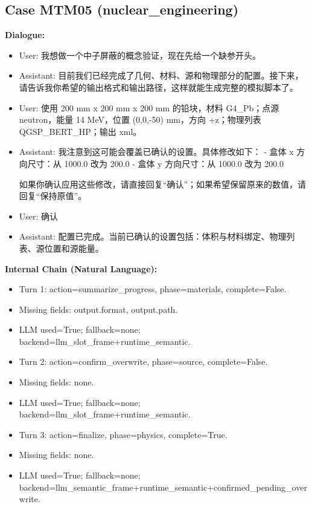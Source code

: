 \documentclass[11pt]{ctexart}
\begin{document}
\subsection{Case MTM05 (nuclear\_engineering)}
\textbf{Dialogue:}
\begin{itemize}
\item User: 我想做一个中子屏蔽的概念验证，现在先给一个缺参开头。
\item Assistant: 目前我们已经完成了几何、材料、源和物理部分的配置。接下来，请告诉我你希望的输出格式和输出路径，这样就能生成完整的模拟脚本了。
\item User: 使用 200 mm x 200 mm x 200 mm 的铅块，材料 G4\_Pb；点源 neutron，能量 14 MeV，位置 (0,0,-50) mm，方向 +z；物理列表 QGSP\_BERT\_HP；输出 xml。
\item Assistant: 我注意到这可能会覆盖已确认的设置。具体修改如下：
- 盒体 x 方向尺寸：从 1000.0 改为 200.0
- 盒体 y 方向尺寸：从 1000.0 改为 200.0

如果你确认应用这些修改，请直接回复“确认”；如果希望保留原来的数值，请回复“保持原值”。
\item User: 确认
\item Assistant: 配置已完成。当前已确认的设置包括：体积与材料绑定、物理列表、源位置和源能量。
\end{itemize}
\textbf{Internal Chain (Natural Language):}
\begin{itemize}
\item Turn 1: action=summarize\_progress, phase=materials, complete=False.
\item Missing fields: output.format, output.path.
\item LLM used=True; fallback=none; backend=llm\_slot\_frame+runtime\_semantic.
\item Turn 2: action=confirm\_overwrite, phase=source, complete=False.
\item Missing fields: none.
\item LLM used=True; fallback=none; backend=llm\_slot\_frame+runtime\_semantic.
\item Turn 3: action=finalize, phase=physics, complete=True.
\item Missing fields: none.
\item LLM used=True; fallback=none; backend=llm\_semantic\_frame+runtime\_semantic+confirmed\_pending\_overwrite.
\end{itemize}
\end{document}
